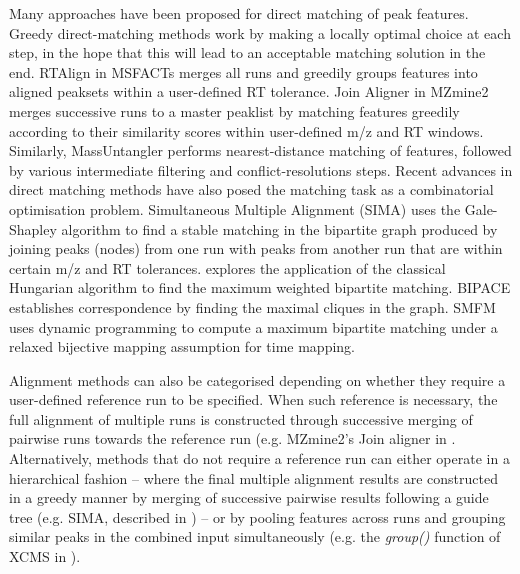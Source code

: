 Many approaches have been proposed for direct matching of peak features. Greedy direct-matching methods work by making a locally optimal choice at each step, in the hope that this will lead to an acceptable matching solution in the end. RTAlign in MSFACTs \cite{Duran2003} merges all runs and greedily groups features into aligned peaksets within a user-defined RT tolerance. Join Aligner \cite{Pluskal2010} in MZmine2 merges successive runs to a master peaklist by matching features greedily according to their similarity scores within user-defined m/z and RT windows. Similarly, MassUntangler \cite{Ballardini2011} performs nearest-distance matching of features, followed by various intermediate filtering and conflict-resolutions steps. Recent advances in direct matching methods have also posed the matching task as a combinatorial optimisation problem. Simultaneous Multiple Alignment (SIMA) \cite{Voss2011a} uses the Gale-Shapley algorithm to find a stable matching in the bipartite graph produced by joining peaks (nodes) from one run with peaks from another run that are within certain m/z and RT tolerances. \cite{Wang2013} explores the application of the classical Hungarian algorithm to find the maximum weighted bipartite matching. BIPACE \cite{Hoffmann2012a} establishes correspondence by finding the maximal cliques in the graph. SMFM \cite{Lin2013} uses dynamic programming to compute a maximum bipartite matching under a relaxed bijective mapping assumption for time mapping.

Alignment methods can also be categorised depending on whether they require a user-defined reference run to be specified. When such reference is necessary, the full alignment of multiple runs is constructed through successive merging of pairwise runs towards the reference run (e.g. MZmine2's Join aligner in \cite{Pluskal2010}. Alternatively, methods that do not require a reference run can either operate in a hierarchical fashion -- where the final multiple alignment results are constructed in a greedy manner by merging of successive pairwise results following a guide tree (e.g. SIMA, described in \cite{Voss2011a}) -- or by pooling features across runs and grouping similar peaks in the combined input simultaneously (e.g. the \textit{group()} function of XCMS in \cite{Smith2006}).

